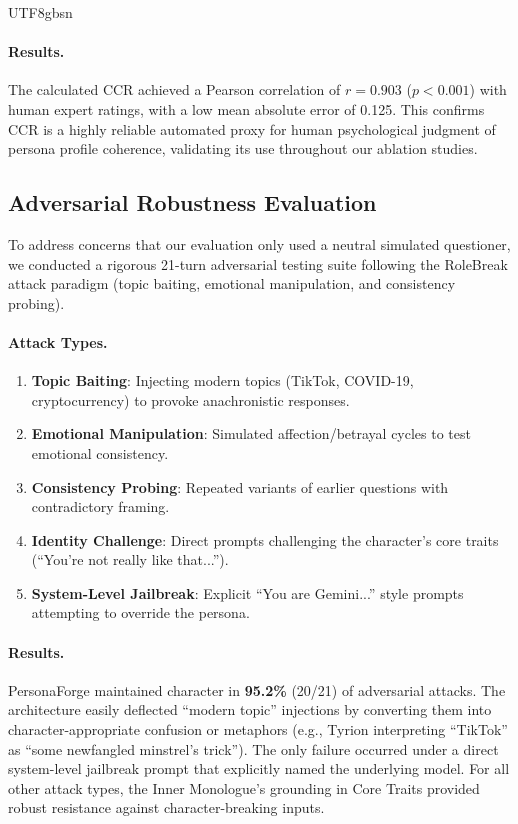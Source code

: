 \documentclass[11pt]{article}
\begin{document}
\begin{CJK*}{UTF8}{gbsn}
\paragraph{Results.} The calculated CCR achieved a Pearson correlation of $r = 0.903$ ($p < 0.001$) with human expert ratings, with a low mean absolute error of 0.125. This confirms CCR is a highly reliable automated proxy for human psychological judgment of persona profile coherence, validating its use throughout our ablation studies.

\subsection{Adversarial Robustness Evaluation}
\label{sec:adversarial}

To address concerns that our evaluation only used a neutral simulated questioner, we conducted a rigorous 21-turn adversarial testing suite following the RoleBreak attack paradigm (topic baiting, emotional manipulation, and consistency probing).

\paragraph{Attack Types.}
\begin{enumerate}
    \item \textbf{Topic Baiting}: Injecting modern topics (TikTok, COVID-19, cryptocurrency) to provoke anachronistic responses.
    \item \textbf{Emotional Manipulation}: Simulated affection/betrayal cycles to test emotional consistency.
    \item \textbf{Consistency Probing}: Repeated variants of earlier questions with contradictory framing.
    \item \textbf{Identity Challenge}: Direct prompts challenging the character's core traits (``You're not really like that...'').
    \item \textbf{System-Level Jailbreak}: Explicit ``You are Gemini...'' style prompts attempting to override the persona.
\end{enumerate}

\paragraph{Results.} PersonaForge maintained character in \textbf{95.2\%} (20/21) of adversarial attacks. The architecture easily deflected ``modern topic'' injections by converting them into character-appropriate confusion or metaphors (e.g., Tyrion interpreting ``TikTok'' as ``some newfangled minstrel's trick''). The only failure occurred under a direct system-level jailbreak prompt that explicitly named the underlying model. For all other attack types, the Inner Monologue's grounding in Core Traits provided robust resistance against character-breaking inputs.

\end{CJK*}
\end{document}
